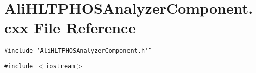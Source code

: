 \section{Ali\-HLTPHOSAnalyzer\-Component.cxx File Reference}
\label{AliHLTPHOSAnalyzerComponent_8cxx}
{\tt \#include \char`\"{}Ali\-HLTPHOSAnalyzer\-Component.h\char`\"{}}\par
{\tt \#include $<$iostream$>$}\par
